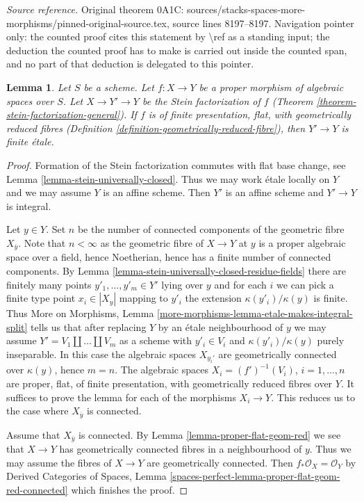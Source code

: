 \documentclass[10pt,a4paper]{amsart}
\theoremstyle{plain}
\newtheorem{lemma}[subsection]{Lemma}
\theoremstyle{definition}
\theoremstyle{remark}
\numberwithin{equation}{subsection}
\begin{document}
\noindent\textit{Source reference.} Original theorem 0A1C: sources/stacks-spaces-more-morphisms/pinned-original-source.tex, source lines 8197--8197. Navigation pointer only: the counted proof cites this statement by \textbackslash{}ref as a standing input; the deduction the counted proof has to make is carried out inside the counted span, and no part of that deduction is delegated to this pointer.\par\medskip
\begin{lemma}
\label{lemma-stein-factorization-etale}
Let $S$ be a scheme.
Let $f : X \to Y$ be a proper morphism of algebraic spaces over $S$.
Let $X \to Y' \to Y$ be the Stein factorization of $f$
(Theorem \ref{theorem-stein-factorization-general}).
If $f$ is of finite presentation, flat, with geometrically
reduced fibres (Definition \ref{definition-geometrically-reduced-fibre}),
then $Y' \to Y$ is finite \'etale.
\end{lemma}

\begin{proof}
Formation of the Stein factorization commutes with flat base change,
see Lemma \ref{lemma-stein-universally-closed}.
Thus we may work \'etale locally on $Y$ and we may assume $Y$
is an affine scheme. Then $Y'$ is an affine scheme and $Y' \to Y$
is integral.

\medskip\noindent
Let $y \in Y$. Set $n$ be the number of connected components of
the geometric fibre $X_{\overline{y}}$. Note that $n < \infty$
as the geometric fibre of $X \to Y$ at $y$ is a proper
algebraic space over a field, hence Noetherian,
hence has a finite number of connected components.
By Lemma \ref{lemma-stein-universally-closed-residue-fields}
there are finitely many points $y'_1, \ldots, y'_m \in Y'$ lying over $y$
and for each $i$ we can pick a finite type point $x_i \in |X_y|$
mapping to $y'_i$ the extension $\kappa(y'_i)/\kappa(y)$ is finite.
Thus More on Morphisms,
Lemma \ref{more-morphisms-lemma-etale-makes-integral-split}
tells us that after replacing $Y$ by an \'etale neighbourhood
of $y$ we may assume $Y' = V_1 \amalg \ldots \amalg V_m$ as a scheme
with $y'_i \in V_i$ and $\kappa(y'_i)/\kappa(y)$ purely inseparable.
In this case the algebraic spaces $X_{y_i'}$
are geometrically connected over $\kappa(y)$, hence $m = n$.
The algebraic spaces $X_i = (f')^{-1}(V_i)$, $i = 1, \ldots, n$
are proper, flat, of finite presentation, with geometrically
reduced fibres over $Y$. It suffices to prove the lemma
for each of the morphisms $X_i \to Y$. This reduces us to the case where
$X_{\overline{y}}$ is connected.

\medskip\noindent
Assume that $X_{\overline{y}}$ is connected. By
Lemma \ref{lemma-proper-flat-geom-red}
we see that $X \to Y$ has geometrically connected
fibres in a neighbourhood of $y$. Thus
we may assume the fibres of $X \to Y$ are geometrically connected.
Then $f_*\mathcal{O}_X = \mathcal{O}_Y$ by
Derived Categories of Spaces, Lemma
\ref{spaces-perfect-lemma-proper-flat-geom-red-connected}
which finishes the proof.
\end{proof}
\end{document}

